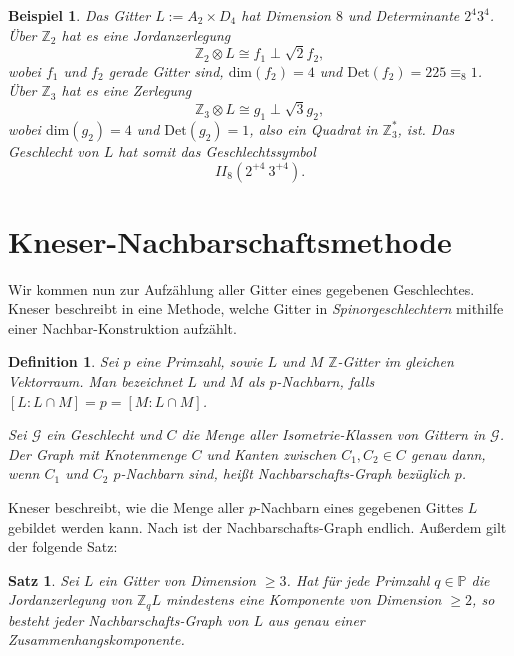 \documentclass[12pt,a4paper,halfparskip,headsepline,bibtotocnumbered]{scrreprt}
\theoremstyle{nummermitklammern}
\newtheorem{definition}[defsatzusw]{Definition}
\newtheorem{satz}[defsatzusw]{Satz}
\newtheorem{beispiel}[defsatzusw]{Beispiel}
\theoremstyle{nonumberbreak}
\newcommand{\Z}{\mathbb{Z}}
\renewcommand{\P}{\mathbb{P}}
\newcommand{\Det}{\text{Det}}
\begin{document}
\begin{beispiel}
	Das Gitter $L := A_2 \times D_4$ hat Dimension $8$ und Determinante $2^4 3^4$. Über $\Z_2$ hat es eine Jordanzerlegung
	\begin{equation*}
		\Z_2 \otimes L \cong f_1 \perp \sqrt{2} f_2,
	\end{equation*}
	wobei $f_1$ und $f_2$ gerade Gitter sind, $\text{dim}(f_2) = 4$ und $\Det(f_2) = 225 \equiv_8 1$. Über $\Z_3$ hat es eine Zerlegung
	\begin{equation*}
		\Z_3 \otimes L \cong g_1 \perp \sqrt{3} g_2,
	\end{equation*}
	wobei $\text{dim}(g_2) = 4$ und $\Det(g_2) = 1$, also ein Quadrat in $\Z_3^\ast$, ist. Das Geschlecht von $L$ hat somit das Geschlechtssymbol
	\begin{equation*}
		II_8(2^{+4}\ 3^{+4}).
	\end{equation*}
\end{beispiel}

\section{Kneser-Nachbarschaftsmethode}

Wir kommen nun zur Aufzählung aller Gitter eines gegebenen Geschlechtes. Kneser beschreibt in \cite[Abschnitt 28]{kneser} eine Methode, welche Gitter in \textit{Spinorgeschlechtern} mithilfe einer Nachbar-Konstruktion aufzählt.

\begin{framed}
	\begin{definition}
		Sei $p$ eine Primzahl, sowie $L$ und $M$ $\Z$-Gitter im gleichen Vektorraum. Man bezeichnet $L$ und $M$ als \textit{$p$-Nachbarn}, falls $\left[ L : L \cap M \right] = p = \left[ M : L \cap M \right]$.\par
		Sei $\mathcal{G}$ ein Geschlecht und $C$ die Menge aller Isometrie-Klassen von Gittern in $\mathcal{G}$. Der Graph mit Knotenmenge $C$ und Kanten zwischen $C_1, C_2 \in C$ genau dann, wenn $C_1$ und $C_2$ $p$-Nachbarn sind, heißt \textit{Nachbarschafts-Graph} bezüglich $p$.
	\end{definition}
\end{framed}

Kneser beschreibt, wie die Menge aller $p$-Nachbarn eines gegebenen Gittes $L$ gebildet werden kann.  Nach \cite{scharlau} ist der Nachbarschafts-Graph endlich. Außerdem gilt der folgende Satz:

\begin{framed}
	\begin{satz}
		Sei $L$ ein Gitter von Dimension $\geq 3$. Hat für jede Primzahl $q \in \P$ die Jordanzerlegung von $\Z_q L$ mindestens eine Komponente von Dimension $\geq 2$, so besteht jeder Nachbarschafts-Graph von $L$ aus genau einer Zusammenhangskomponente.
	\end{satz}
\end{framed}
\end{document}
